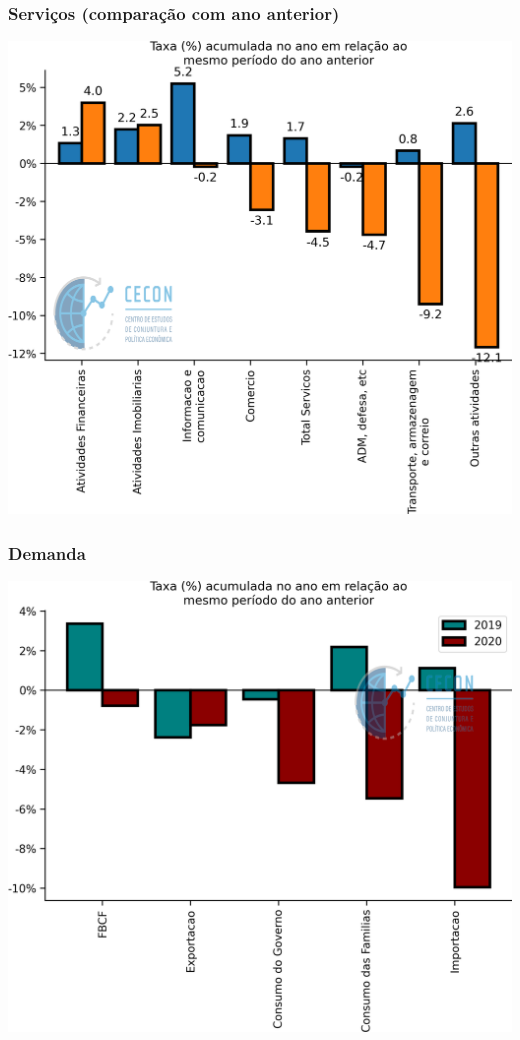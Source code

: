 \documentclass{SelfArx}
\begin{document}
\subsubsection*{Serviços (comparação com ano anterior)}
\label{sec:org952acc0}

\begin{center}
\includegraphics[width=.9\linewidth]{./figs/PIB/Servicos_Acum_Comparativo.png}
\end{center}

\subsubsection*{Demanda}
\label{sec:org6e7f4f3}

\begin{center}
\includegraphics[width=.9\linewidth]{./figs/PIB/Demanda_Acum.png}
\end{center}
\end{document}
